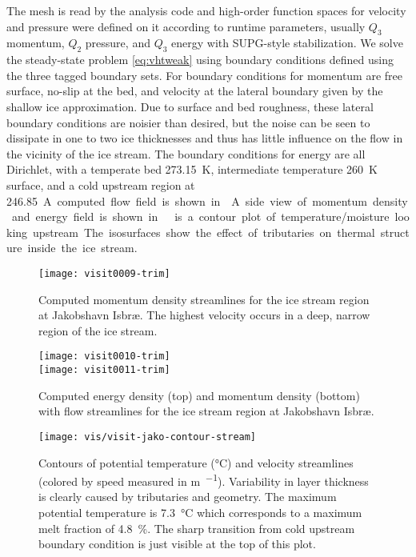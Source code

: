 The mesh is read by the analysis code and high-order function spaces for velocity and pressure were defined on it according to runtime parameters, usually $Q_3$ momentum, $Q_2$ pressure, and $Q_3$ energy with SUPG-style stabilization.
We solve the steady-state problem \eqref{eq:vhtweak} using boundary conditions defined using the three tagged boundary sets.
For boundary conditions for momentum are free surface, no-slip at the bed, and velocity at the lateral boundary given by the shallow ice approximation.
Due to surface and bed roughness, these lateral boundary conditions are noisier than desired, but the noise can be seen to dissipate in one to two ice thicknesses and thus has little influence on the flow in the vicinity of the ice stream.
The boundary conditions for energy are all Dirichlet, with a temperate bed \SI{273.15}{\kelvin}, intermediate temperature \SI{260}{\kelvin} surface, and a cold upstream region at \SI{246.85}.
A computed flow field is shown in .
A side view of momentum density and energy field is shown in .
 is a contour plot of temperature/moisture looking upstream.
The isosurfaces show the effect of tributaries on thermal structure inside the ice stream.

\begin{figure}
  \centering\texttt{[image: visit0009-trim]}
  \caption{Computed momentum density streamlines for the ice stream region at Jakobshavn Isbr{\ae}. The highest velocity occurs in a deep, narrow region of the ice stream.}\label{fig:jakoflow}
\end{figure}

\begin{figure}
  \centering
  \texttt{[image: visit0010-trim]} \\
  \texttt{[image: visit0011-trim]}
  \caption{Computed energy density (top) and momentum density (bottom) with flow streamlines for the ice stream region at Jakobshavn Isbr{\ae}.}\label{fig:jakosideview}
\end{figure}

\begin{figure}
  \centering
  \texttt{[image: vis/visit-jako-contour-stream]}
  \caption{Contours of potential temperature (\si{\degreeCelsius}) and velocity streamlines (colored by speed measured in \si{\metre\per\year}).
    Variability in layer thickness is clearly caused by tributaries and geometry.
    The maximum potential temperature is \SI{7.3}{\degreeCelsius} which corresponds to a maximum melt fraction of \SI{4.8}{\percent}.
    The sharp transition from cold upstream boundary condition is just visible at the top of this plot.
  }\label{fig:jakocontourstream}
\end{figure}

